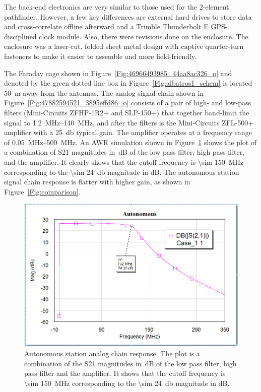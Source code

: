 The back-end electronics are very similar to those used for the 2-element pathfinder. However, a few key differences are external hard drives to store data and cross-correlate offline afterward and a Trimble Thunderbolt E GPS-disciplined clock module. Also, there were revisions done on the enclosure. The enclosure was a laser-cut, folded sheet metal design with captive quarter-turn fasteners to make it easier to assemble and more field-friendly.

The Faraday cage shown in Figure~\ref{Fig:46966493985_44aa8ac326_o} and denoted by the green dotted line box in Figure~\ref{Fig:albatros1_schem} is located \SI{50}{\meter} away from the antennas. The analog signal chain shown in Figure~\ref{Fig:47882594521_3895effd86_o} consists of a pair of high- and low-pass filters (Mini-Circuits ZFHP-1R2+ and SLP-150+) that together band-limit the signal to \SIrange{1.2}{140}{\mega\hertz}, and after the filters is the Mini-Circuits ZFL-500+ amplifier  with a \SI{25}{\decibel} typical gain. The amplifier operates at a frequency range of \SIrange{0.05}{500}{\mega\hertz}. An AWR simulation shown in Figure~\ref{Fig:auto} shows the plot of a combination of S21 magnitudes in~dB of the low pass filter, high pass filter, and the amplifier. It clearly shows that the cutoff frequency is \SI{\sim 150}{MHz} corresponding to the \SI{\sim 24}{\decibel} magnitude in dB. The autonomous station signal chain response is flatter with higher gain, as shown in Figure~\ref{Fig:comparison}.

\begin{figure}
	\centering
	\includegraphics[width=0.7\linewidth]{Figures/auto}
	\caption{Autonomous station analog chain response. The plot is a combination of the S21 magnitudes in~dB of the low pass filter, high pass filter and the amplifier. It shows that the cutoff frequency is \SI{\sim 150}{MHz} corresponding to the \SI{\sim 24}{\decibel} magnitude in dB.}
	\label{Fig:auto}
\end{figure}

